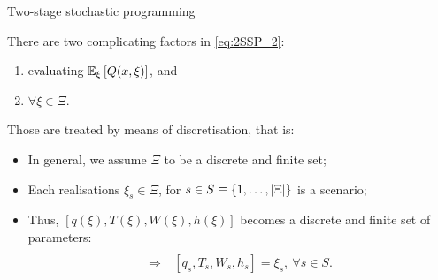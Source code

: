 \begin{frame}{Two-stage stochastic programming}
	
	There are two complicating factors in \eqref{eq:2SSP_2}:
		\vspace{-6pt}
	\begin{enumerate}
		\item evaluating $\mathbb{E}_\xi\left[ Q(x, \xi) \right]$, and 
		\item $\forall \xi \in \Xi$.	
	\end{enumerate}
	
	\pause
	Those are treated by means of \alert{discretisation}, that is: 
	\vspace{-6pt} 
	\begin{itemize}
		\item In general, we assume $\Xi$ to be a \alert{discrete} and \alert{finite} set;
		\item Each realisations $\xi_s \in \Xi$, for $s \in S \equiv \left\{ 1, \dots, |\Xi| \right \}$ is a \alert{scenario};
		\item Thus,	$[q(\xi), T(\xi), W(\xi), h(\xi)]$ becomes a discrete and finite set of parameters:
		\begin{align*}
			 [&q(\xi_1), T(\xi_1), W(\xi_1), h(\xi_1); \\
			    &q(\xi_2), T(\xi_2), W(\xi_2), h(\xi_2); \\
			    &\dots ;\\
				& q(\xi_{|\Xi|}), T(\xi_{|\Xi|}), W(\xi_{|\Xi|}), h(\xi_{|\Xi|})] \\
				\Rightarrow~ & [q_s, T_s, W_s, h_s] = \xi_s, \ \forall s \in S.
		\end{align*}
	\end{itemize}
	
\end{frame}


